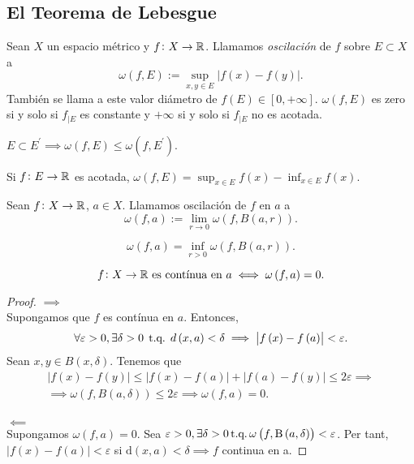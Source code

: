 \subsection{El Teorema de Lebesgue}
\begin{defi}
    Sean $X$ un espacio métrico y $f\colon X \to \mathbb{R}$. Llamamos 
    \textit{oscilación} de $f$ sobre $E \subset X$ a
    \[
        \omega\left( f, E \right) := \sup_{x, y \in E} \left| f\left( x\right) - 
        f\left( y\right)\right|.
    \]
    También se llama a este valor diámetro de $f\left( E\right) \in \left[ 
    0, +\infty \right]$. $\omega\left( f, E \right)$ es zero si y solo si $f_{|E}$ es 
    constante y $+\infty$ si y solo si $f_{|E}$ no es acotada.
\end{defi}
\begin{obs}
	$E \subset E^{\prime} \implies \omega\left( f, E\right) \leq \omega\left( f, E^{
	\prime}\right)$.
\end{obs}
\begin{lema}
    Si $f\colon E \to \mathbb{R}$ es acotada, $\omega \left( f, E \right)= \sup_{x\in E}
    f\left( x\right) - \inf_{x\in E} f\left( x\right)$.
\end{lema}
\begin{defi}
    Sean $f\colon X \to \mathbb{R}$, $a\in X$. Llamamos oscilación de $f$ en $a$ a
    \[
        \omega\left( f, a\right) := \lim_{r\to 0} \omega\left( f, B\left( a, r 
        \right) \right).
    \]
\end{defi}
\begin{obs*}
    \[
        \omega\left( f, a\right) = \inf_{r>0} \omega\left( f, B\left( 
        a, r\right) \right).
    \]
\end{obs*}
\begin{lema}
    \[
        f\colon X \to \mathbb{R} \text{  es contínua en $a$} \iff \omega\left( f, a\right)
        = 0.
    \]
\end{lema}
\begin{proof}
    $\implies$ \\
    Supongamos que $f$ es contínua en $a$. Entonces,
    \[
        \forall \varepsilon > 0, \exists \delta > 0 \; \operatorname{\text{t.q.}} \; d\left(x, a \right)
        <\delta \implies \left| f\left(x \right) - f\left( a \right) \right| 
        < \varepsilon.
    \]
    Sean $x, y \in B\left( x, \delta \right)$. Tenemos que
    \[
        \begin{gathered}
            \left| f\left(x \right) - f\left( y \right) \right| \leq
            \left| f\left(x \right) - f\left( a \right) \right| +
            \left| f\left(a \right) - f\left( y \right) \right| \leq 2\varepsilon
            \implies \\
            \implies \omega\left( f, B\left( a, \delta \right) \right) \leq 
            2\varepsilon \implies \omega \left( f, a \right) =0.
        \end{gathered}
    \] \\
    $\impliedby$ \\
    Supongamos $\omega \left( f, a \right) = 0$. Sea $\varepsilon > 0, \exists \delta > 0 \operatorname{\text{t.q.}} \omega \left( f, \text{B}\left(a, \delta \right) \right) < \varepsilon$. Per tant, $|f(x) - f(a)| < \varepsilon$ si $\text{d}\left( x, a \right) < \delta \implies f$ continua en a.
\end{proof}
